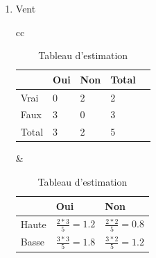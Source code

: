 \documentclass[a4paper, 11pt]{report}
\begin{document}
\begin{itemize}
\begin{enumerate}
\begin{table}[!h]
\begin{small}
\begin{tabular}{cc}
\begin{minipage}{.5\linewidth}
    \end{minipage} &

    \begin{minipage}{.5\linewidth}
\begin{tabular}{| l | l | l |}
\hline
 & Oui & Non\\
\hline
Haute & $\frac{2*3}{5} = 1.2$ & $\frac{2*2}{5} = 0.8$\\
\hline
Basse & $\frac{3*3}{5} = 1.8$ & $\frac{3*2}{5} = 1.2$ \\
\hline
\end{tabular} 
      \caption{Tableau d'estimation}
 
   \end{minipage} 
\end{tabular}
\end{small}
\end{table}

$X^2(Humidité) = \frac{(1-1.2)^2}{1.2}+\frac{(1-0.8)^2}{0.8}+\frac{(2-1.8)^2}{1.8}+\frac{(1-1.2)^2}{1.2}\\
X^2(Humidité) = 0.13$



\item Vent

\begin{table}[!h]
\begin{small}
\begin{tabular}{cc}

    \begin{minipage}{.5\linewidth}
   
\begin{tabular}{| l | l | l | l | l |}
\hline
 & Oui & Non & Total\\
\hline
Vrai & 0 & 2 & 2\\
\hline
Faux & 3 & 0 & 3 \\
\hline
Total & 3 & 2 & 5 \\
\hline
\end{tabular} 
      \caption{Tableau d'observation}

    \end{minipage} &

    \begin{minipage}{.5\linewidth}
\begin{tabular}{| l | l | l |}
\hline
 & Oui & Non\\
\hline
Haute & $\frac{2*3}{5} = 1.2$ & $\frac{2*2}{5} = 0.8$\\
\hline
Basse & $\frac{3*3}{5} = 1.8$ & $\frac{3*2}{5} = 1.2$ \\
\hline
\end{tabular} 
      \caption{Tableau d'estimation}
 

\end{minipage}
\end{tabular}
\end{small}
\end{table}
\end{enumerate}
\end{itemize}
\end{document}
